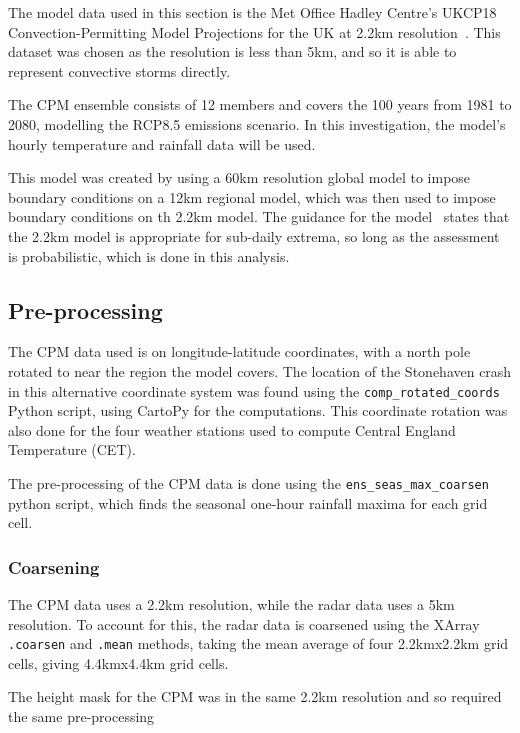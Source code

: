 The model data used in this section is
    the Met Office Hadley Centre's UKCP18 Convection-Permitting Model Projections for the UK at 2.2km resolution~\cite{model_data}.
This dataset was chosen as the resolution is less than 5km,
    and so it is able to represent convective storms directly.

The CPM ensemble consists of 12 members and covers the 100 years from 1981 to 2080,
    modelling the RCP8.5 emissions scenario.
In this investigation,
    the model's hourly temperature and rainfall data will be used.

This model was created by using a 60km resolution global model to impose boundary conditions on a 12km regional model,
    which was then used to impose boundary conditions on th 2.2km model.
The guidance for the model~\cite{model_data} states that the 2.2km model is appropriate for sub-daily extrema,
    so long as the assessment is probabilistic,
    which is done in this analysis.

\subsection{Pre-processing}\label{subsec:preprocess}

The CPM data used is on longitude-latitude coordinates,
    with a north pole rotated to near the region the model covers.
The location of the Stonehaven crash in this alternative coordinate system was found using the \texttt{comp\_rotated\_coords} Python script,
    using CartoPy for the computations.
This coordinate rotation was also done for the four weather stations used to compute Central England Temperature (CET).

The pre-processing of the CPM data is done using the \texttt{ens\_seas\_max\_coarsen} python script,
    which finds the seasonal one-hour rainfall maxima for each grid cell.

\subsubsection{Coarsening}

The CPM data uses a 2.2km resolution,
    while the radar data uses a 5km resolution.
To account for this,
    the radar data is coarsened using the XArray \texttt{.coarsen} and \texttt{.mean} methods,
    taking the mean average of four 2.2kmx2.2km grid cells, giving 4.4kmx4.4km grid cells.

The height mask for the CPM was in the same 2.2km resolution
    and so required the same pre-processing

